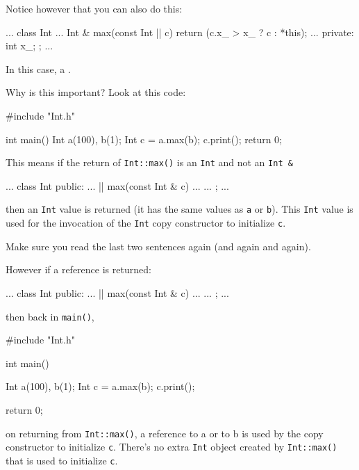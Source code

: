Notice however that you can also do this:

\begin{consolethree}[escapeinside=||]
...
class Int
{
    ...
    Int & max(const Int |\EMPHASIZE{\&}| c)
    {
        return (c.x_ > x_ ? c : *this);
    }
    ...
private:
    int x_;
};
...
\end{consolethree}

In this case, a .

Why is this important? Look at this code:

\begin{consolethree}[escapeinside=||]
#include "Int.h"

int main()
{
    Int a(100), b(1);
    Int c = a.max(b);
    c.print();
    return 0;
}
\end{consolethree}

This means if the return of \texttt{Int::max()} is an \texttt{Int} and not
an \texttt{Int \&}

\begin{consolethree}[escapeinside=||]
...
class Int
{
public:
    ...
    || max(const Int & c)
    {
        ...
    }
    ...
};
...
\end{consolethree}

then an \texttt{Int} value is returned (it has the same values as \texttt{a}
or \texttt{b}). This \texttt{Int} value is used for the invocation of the
\texttt{Int} copy constructor to initialize \texttt{c}.

Make sure you read the last two sentences again (and again and again).

However if a reference is returned:

\begin{consolethree}[escapeinside=||]
...
class Int
{
public:
    ...
    || max(const Int & c)
    {
        ...
    }
    ...
};
...
\end{consolethree}

then back in \texttt{main()},
\begin{consolethree}
#include "Int.h"

int main()
{
    Int a(100), b(1);
    Int c = a.max(b);
    c.print();
    
    return 0;
}
\end{consolethree}

on returning from \texttt{Int::max()}, a reference to a or to b is used by
the copy constructor to initialize \texttt{c}. There's no
extra \texttt{Int} object created by \texttt{Int::max()} that is used to
initialize \texttt{c}.

